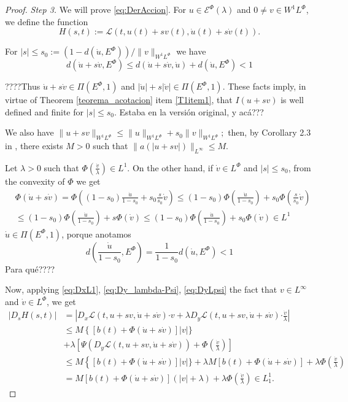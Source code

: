 \documentclass[twoside]{article}
\theoremstyle{remark}
\newcommand{\linf}{\|_{L^{\infty}}}
\newcommand{\lphi}{L^{\Phi}}
\newcommand{\ephi}{E^{\Phi}}
\newcommand{\wphi}{W^{1}\lphi}
\newcommand{\sobnor}{\|_{W^{1}\lphi}}
\newcommand{\domi}{\mathcal{E}^{\Phi}(\lambda)}
\renewcommand{\b}[1]{\boldsymbol{#1}}
\newcommand{\ccdot}{\b{\cdot}}
\renewcommand{\leq}{\leqslant}
\begin{document}
\begin{proof}
\emph{Step 3.} We will prove \eqref{eq:DerAccion}. 
For $u\in \domi$ and $0\neq v\in\wphi$, we define the function
\[H(s,t):=\mathcal{L}(t,u(t)+s v(t),\dot{u}(t)+s\dot{v}(t)).\]


For  $|s|\leq s_0:=\left(1-d(\dot{u},\ephi)\right)/\|v\sobnor$ we have
\[
d \left(\dot{u}+s \dot{v}, \ephi \right)
\leq
d (\dot{u}+s\dot{v}, \dot{u})+ d(\dot{u},\ephi)<1
\]

????Thus $\dot{u}+s\dot{v} \in \Pi(\ephi,1)$ and  $|\dot{u}|+s|\dot{v}| \in \Pi(\ephi,1)$. These facts imply, in virtue of Theorem \ref{teorema_acotacion} item \ref{T1item1}, that $I(u+s v)$ is well defined and finite for $|s|\leq s_0$. 
Estaba en la versi\'on original, y ac\'a???

We also have 
$
\|u+sv\sobnor\leq \|u\sobnor+s_0\|v\sobnor;
$
then, by Corollary 2.3 in \cite{ABGMS2015}, there exists $M>0$ such that 
$\|a(|u+sv|)\linf\leq M$.

Let $\lambda>0$ such that $\Phi(\frac{\dot{v}}{\lambda})\in L^1$.
On the other hand, if $\dot{v}\in\lphi$ and $|s|\leq s_0 $,
from the convexity of $\Phi$ we get
\[
\begin{split}
&\Phi(\dot{u}+s\dot{v})=
\Phi\left((1-s_0)\frac{\dot{u}}{1-s_0}+s_0 \frac{s}{s_0}\dot{v}\right)
\leq
(1-s_0)\Phi\left(\frac{\dot{u}}{1-s_0}\right)+s_0 \Phi\left(\frac{s}{s_0}\dot{v}\right)
\\
&\leq
(1-s_0)\Phi\left(\frac{\dot{u}}{1-s_0}\right)+s \Phi(\dot{v})
\leq
(1-s_0)\Phi\left(\frac{\dot{u}}{1-s_0}\right)+s_0 \Phi(\dot{v})\in L^1
\end{split}
\]
$\dot{u}\in\Pi(\ephi,1)$, porque anotamos
\[
d(\frac{\dot{u}}{1-s_0},E^{\Phi})=\frac{1}{1-s_0}d(\dot{u}, E^{\Phi})<1
\]
Para qu\'e????

Now, applying \eqref{eq:DxL1}, \eqref{eq:Dy_lambda-Psi}, \eqref{eq:DyLpsi} 
the fact that $v \in L^{\infty}$ and $\dot{v}\in\lphi$, 
we get
\begin{equation}\label{ctg}
\begin{split}
|D_s H(s,t)|&=\left| D_{x}\mathcal{L}(t,u+sv,\dot{u}+s\dot{v})\ccdot v +  
\lambda D_{y}\mathcal{L}(t, u+s v, \dot{u}+s\dot{v})\ccdot\frac{\dot{v}}{\lambda}\right| \\
 & \leq M \left\{\left[ b(t)+ \Phi(\dot{u}+s\dot{v})\right]|v|\}\\
&+ \lambda\left[\Psi(D_{y}\mathcal{L}(t,u+sv,\dot{u}+s\dot{v}))+\Phi\left(\frac{\dot{v}}{\lambda}\right) \right]
\\
&\leq M \left\{\left[ b(t)+ \Phi(\dot{u}+s\dot{v})\right]|v|\}+
\lambda M[ b(t)+ \Phi(\dot{u}+s\dot{v})]+\lambda \Phi\left(\frac{\dot{v}}{\lambda}\right)
\\&=
M [ b(t)+ \Phi(\dot{u}+s\dot{v})] (|v|+\lambda) +\lambda \Phi\left(\frac{\dot{v}}{\lambda}\right)
\in L^1_1.
\end{split}
\end{equation}


\end{proof}
\end{document}
